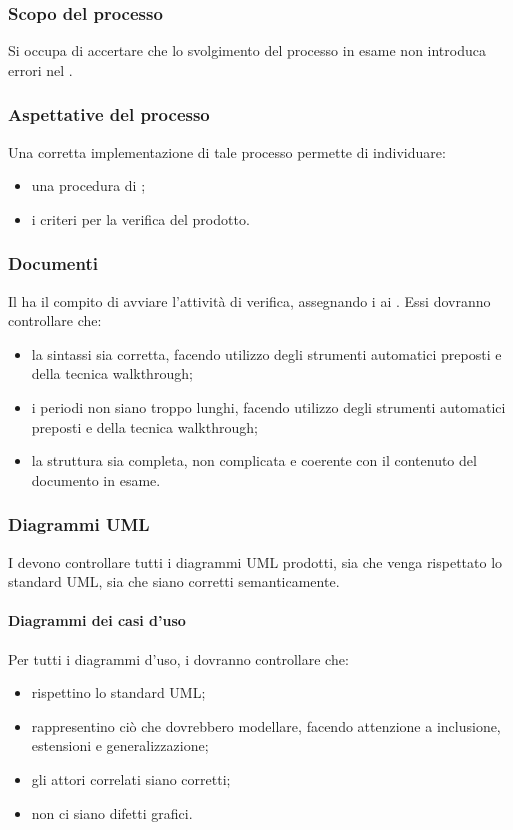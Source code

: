 \subsubsection{Scopo del processo}
Si occupa di accertare che lo svolgimento del processo in esame non introduca errori nel .
\subsubsection{Aspettative del processo}
Una corretta implementazione di tale processo permette di individuare:
\begin{itemize}
	\item una procedura di ;
	\item i criteri per la verifica del prodotto.
\end{itemize}
\subsubsection{Documenti}
Il \RESP{} ha il compito di avviare l'attività di verifica, assegnando i  ai \VERP{}. Essi dovranno controllare che:
\begin{itemize}
	\item la sintassi sia corretta, facendo utilizzo degli strumenti automatici preposti e della tecnica walkthrough;
	\item i periodi non siano troppo lunghi, facendo utilizzo degli strumenti automatici preposti e della tecnica walkthrough;
	\item la struttura sia completa, non complicata e coerente con il contenuto del documento in esame.
\end{itemize}

\subsubsection{Diagrammi UML}
I \VERP{} devono controllare tutti i diagrammi UML prodotti, sia che
venga rispettato lo standard UML, sia che siano corretti semanticamente.
\paragraph{Diagrammi dei casi d'uso}
Per tutti i diagrammi d'uso, i \VERP{} dovranno controllare che:
\begin{itemize}
	\item rispettino lo standard UML;
	\item rappresentino ciò che dovrebbero modellare, facendo attenzione a inclusione, estensioni e generalizzazione;
	\item gli attori correlati siano corretti;
	\item non ci siano difetti grafici.
\end{itemize}
